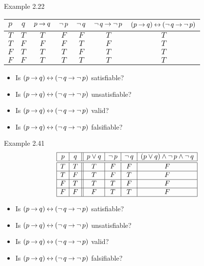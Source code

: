 \documentclass[style=sailor,size=12pt]{powerdot}
\theoremstyle{definition}
\begin{document}
\begin{wideslide}[bm=,toc=]{Example 2.22}
\begin{center}
\begin{tabular}{|c|c||c|c|c|c|c|}
\hline
$p$ & $q$ & $p \imp q$ & $\ngg p$ & $\ngg q$ 
& $\ngg q \imp \ngg p$ & $(p\imp q)\eqv  (\ngg q\imp \ngg p)$\\ \hline \hline
$T$ & $T$ & $T$  & $F$ & $F$  & $T$ & $T$  \\ \hline
$T$ & $F$ & $F$ & $F$ & $T$  & $F$ & $T$   \\ \hline
$F$ & $T$ & $T$ & $T$ & $F$  & $T$ & $T$   \\ \hline
$F$ & $F$ & $T$ & $T$ & $T$  & $T$ & $T$   \\ \hline
\end{tabular}
\end{center}
\begin{itemize}
\item Is $(p\imp q)\eqv  (\ngg q\imp \ngg p)$ satisfiable?
\item Is $(p\imp q)\eqv  (\ngg q\imp \ngg p)$ unsatisfiable?
\item Is $(p\imp q)\eqv  (\ngg q\imp \ngg p)$ valid?
\item Is $(p\imp q)\eqv  (\ngg q\imp \ngg p)$ falsifiable?
\end{itemize}
\end{wideslide}

\begin{wideslide}[bm=,toc=]{Example 2.41}
\begin{displaymath}
\begin{array}{|c|c||c|c|c|c|}
\hline
p & q & p \vee q & \ngg p & \ngg q &
(p \vee q) \wedge \ngg p \wedge \ngg q \\ \hline \hline
T & T & T & F & F & F \\ \hline
T & F & T & F & T & F \\ \hline
F & T & T & T & F & F \\ \hline
F & F & F & T & T & F \\ \hline
\end{array}
\end{displaymath}
\begin{itemize}
\item Is $(p\imp q)\eqv  (\ngg q\imp \ngg p)$ satisfiable?
\item Is $(p\imp q)\eqv  (\ngg q\imp \ngg p)$ unsatisfiable?
\item Is $(p\imp q)\eqv  (\ngg q\imp \ngg p)$ valid?
\item Is $(p\imp q)\eqv  (\ngg q\imp \ngg p)$ falsifiable?
\end{itemize}
\end{wideslide}
\end{document}
